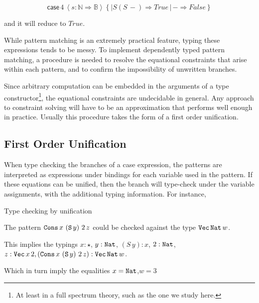 \[
\mathsf{case}\,4\,\left\langle s:\mathbb{N}\Rightarrow\mathbb{B}\right\rangle \left\{ |S\left(S\,-\right)\Rightarrow True\,|\,-\Rightarrow False\right\} 
\]

and it will reduce to $True$.

While pattern matching is an extremely practical feature, typing these expressions tends to be messy.
To implement dependently typed pattern matching, a procedure is needed to resolve the equational constraints that arise within each pattern, and to confirm the impossibility of unwritten branches.

Since arbitrary computation can be embedded in the arguments of a type constructor\footnote{
  At least in a full spectrum theory, such as the one we study here.
  }, the equational constraints are undecidable in general.
Any approach to constraint solving will have to be an approximation that performs well enough in practice.
Usually this procedure takes the form of a first order unification. 




\subsection{First Order Unification}

When type checking the branches of a case expression, the patterns are interpreted as expressions under bindings for each variable used in the pattern.
If these equations can be unified, then the branch will type-check under the variable assignments, with the additional typing information.
For instance,
\begin{example}
Type checking by unification

The pattern $\mathtt{Cons}{}\,x\,\left(\mathtt{S}{}\,y\right)\,2\,z$ could be checked against the type $\mathtt{Vec}{}\,\mathtt{Nat}{}\,w$.

This implies the typings $x:\star$, $y:\mathtt{Nat}{}$, $\left(S\,y\right):x$, $2:\mathtt{Nat}{}$, $z:\mathtt{Vec}{}\,x\,2,\left(\mathtt{Cons}{}\,x\,\left(\mathtt{S}{}\,y\right)\,2\,z\right):\mathtt{Vec}{}\,\mathtt{Nat}{}\,w$.

Which in turn imply the equalities $x=\mathtt{Nat}{}$,$w=3$
\end{example}

